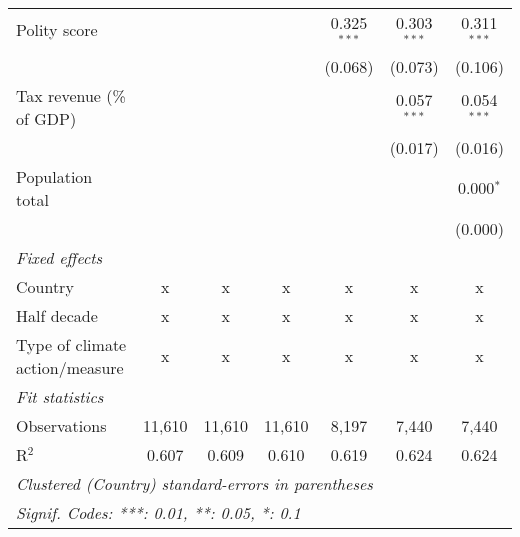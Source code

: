 \begin{tabular}{lcccccc}
   Polity score                                                            &         &                &                & 0.325$^{***}$  & 0.303$^{***}$  & 0.311$^{***}$\\   
                                                                           &         &                &                & (0.068)        & (0.073)        & (0.106)\\   
   Tax revenue (\% of GDP)                                                 &         &                &                &                & 0.057$^{***}$  & 0.054$^{***}$\\   
                                                                           &         &                &                &                & (0.017)        & (0.016)\\   
   Population total                                                        &         &                &                &                &                & 0.000$^{*}$\\   
                                                                           &         &                &                &                &                & (0.000)\\   
   \emph{Fixed effects}\\
   Country                                                                 & x       & x              & x              & x              & x              & x\\  
   Half decade                                                             & x       & x              & x              & x              & x              & x\\  
   Type of climate action/measure                                          & x       & x              & x              & x              & x              & x\\  
   \midrule \emph{Fit statistics}\\
   Observations                                                            & 11,610  & 11,610         & 11,610         & 8,197          & 7,440          & 7,440\\  
   R$^2$                                                                   & 0.607   & 0.609          & 0.610          & 0.619          & 0.624          & 0.624\\  
   \midrule
   \multicolumn{7}{l}{\emph{Clustered (Country) standard-errors in parentheses}}\\
   \multicolumn{7}{l}{\emph{Signif. Codes: ***: 0.01, **: 0.05, *: 0.1}}\\
\end{tabular}
\par\endgroup


